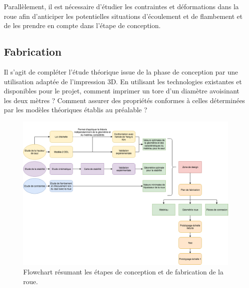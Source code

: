 Parallèlement, il est nécessaire d’étudier les contraintes et déformations dans la roue afin d'anticiper les potentielles situations d'écoulement et de flambement et de les prendre en compte dans l'étape de conception.

\subsection{Fabrication}
Il s’agit de compléter l’étude théorique issue de la phase de conception par une utilisation adaptée de l’impression 3D. En utilisant les technologies existantes et disponibles pour le projet, comment imprimer un tore d’un diamètre avoisinant les deux mètres ? Comment assurer des propriétés conformes à celles déterminées par les modèles théoriques établis au préalable ? 

\begin{figure}[htb]
\centering
\includegraphics[width=7in]{images_autres/flowchart.png}
\caption{Flowchart résumant les étapes de conception et de fabrication de la roue.}
\label{fig:flowchart}
\end{figure}

